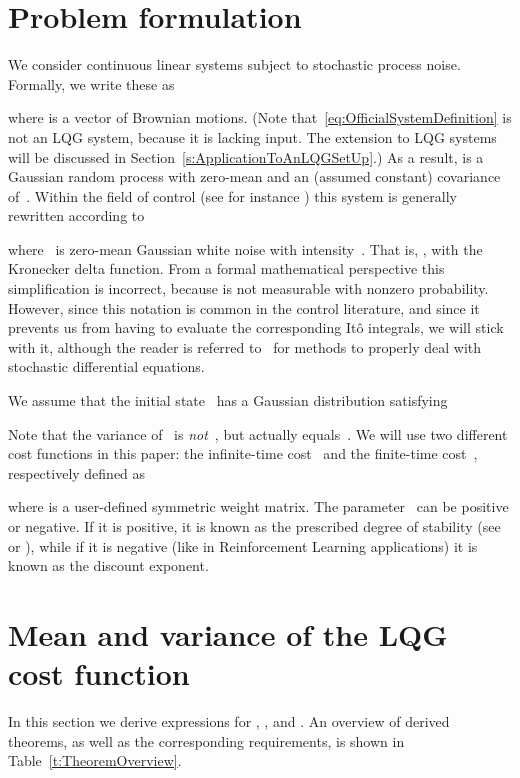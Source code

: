 \documentclass[twocolumn]{autart}
\begin{document}
\section{Problem formulation} \label{s:ProblemSetUp}

We consider continuous linear systems subject to stochastic process noise. Formally, we write these as

where  is a vector of Brownian motions. (Note that~\eqref{eq:OfficialSystemDefinition} is not an LQG system, because it is lacking input. The extension to LQG systems will be discussed in Section~\ref{s:ApplicationToAnLQGSetUp}.) As a result,  is a Gaussian random process with zero-mean and an (assumed constant) covariance of~. Within the field of control (see for instance \cite{MFCBook}) this system is generally rewritten according to

where~ is zero-mean Gaussian white noise with intensity~. That is, , with  the Kronecker delta function. From a formal mathematical perspective this simplification is incorrect, because  is not measurable with nonzero probability. However, since this notation is common in the control literature, and since it prevents us from having to evaluate the corresponding It\^o integrals, we will stick with it, although the reader is referred to~\cite{StochasticDEBook} for methods to properly deal with stochastic differential equations.

We assume that the initial state~ has a Gaussian distribution satisfying

Note that the variance of~ is \textit{not}~, but actually equals~\mbox{}. We will use two different cost functions in this paper: the infinite-time cost~ and the finite-time cost~, respectively defined as

where  is a user-defined symmetric weight matrix. The parameter~ can be positive or negative. If it is positive, it is known as the prescribed degree of stability (see \cite{LQBook} or \cite{DMCSBook}), while if it is negative (like in Reinforcement Learning applications) it is known as the discount exponent.

\section{Mean and variance of the LQG cost function} \label{s:PropertiesOfLQGCost}

In this section we derive expressions for , ,  and . An overview of derived theorems, as well as the corresponding requirements, is shown in Table~\ref{t:TheoremOverview}.
\end{document}
